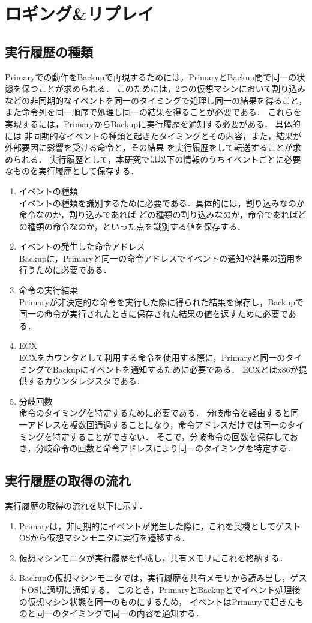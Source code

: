 \documentclass[12pt]{jsarticle}
\begin{document}
\section{ロギング\&リプレイ}
\subsection{実行履歴の種類}
Primaryでの動作をBackupで再現するためには，PrimaryとBackup間で同一の状態を保つことが求められる．
このためには，2つの仮想マシンにおいて割り込みなどの非同期的なイベントを同一のタイミングで処理し同一の結果を得ること，
また命令列を同一順序で処理し同一の結果を得ることが必要である．
これらを実現するには，PrimaryからBackupに実行履歴を通知する必要がある．
具体的には
非同期的なイベントの種類と起きたタイミングとその内容，また，結果が外部要因に影響を受ける命令と，その結果
を実行履歴をして転送することが求められる．
実行履歴として，本研究では以下の情報のうちイベントごとに必要なものを実行履歴として保存する．
\begin{enumerate}
\item イベントの種類\\
イベントの種類を識別するために必要である．具体的には，割り込みなのか命令なのか，割り込みであれば
どの種類の割り込みなのか，命令であればどの種類の命令なのか，といった点を識別する値を保存する．
\item イベントの発生した命令アドレス\\
Backupに，Primaryと同一の命令アドレスでイベントの通知や結果の適用を行うために必要である．
\item 命令の実行結果\\
Primaryが非決定的な命令を実行した際に得られた結果を保存し，Backupで同一の命令が実行されたときに保存された結果の値を返すために必要である．
\item ECX\\
ECXをカウンタとして利用する命令を使用する際に，Primaryと同一のタイミングでBackupにイベントを通知するために必要である．
ECXとはx86が提供するカウンタレジスタである．
\item 分岐回数\\
命令のタイミングを特定するために必要である．
分岐命令を経由すると同一アドレスを複数回通過することになり，命令アドレスだけでは同一のタイミングを特定することができない．
そこで，分岐命令の回数を保存しておき，分岐命令の回数と命令アドレスにより同一のタイミングを特定する．
\end{enumerate}
\subsection{実行履歴の取得の流れ}
実行履歴の取得の流れを以下に示す．
\begin{enumerate}
\item Primaryは，非同期的にイベントが発生した際に，これを契機としてゲストOSから仮想マシンモニタに実行を遷移する．
\item 仮想マシンモニタが実行履歴を作成し，共有メモリにこれを格納する．
\item Backupの仮想マシンモニタでは，実行履歴を共有メモリから読み出し，ゲストOSに適切に通知する．
このとき，PrimaryとBackupとでイベント処理後の仮想マシン状態を同一のものにするため，
イベントはPrimaryで起きたものと同一のタイミングで同一の内容を通知する．
\end{enumerate}
\end{document}
